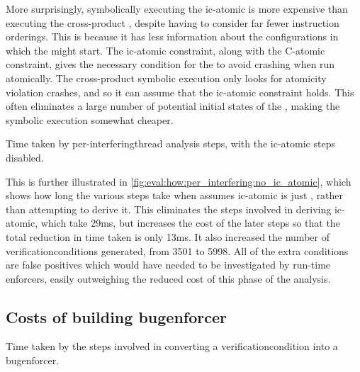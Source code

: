 More surprisingly, symbolically executing the \gls{ic-atomic}
{\StateMachine} is more expensive than executing the cross-product
{\StateMachine}, despite having to consider far fewer instruction
orderings.  This is because it has less information about the
configurations in which the {\StateMachines} might start.  The
\gls{ic-atomic} constraint, along with the C-atomic constraint, gives
the necessary condition for the {\StateMachines} to avoid crashing
when run atomically.  The cross-product symbolic execution only looks
for atomicity violation crashes, and so it can assume that the
\gls{ic-atomic} constraint holds.  This often eliminates a large
number of potential initial states of the {\StateMachines}, making the
symbolic execution somewhat cheaper.

\begin{sanefig}
  \caption{Time taken by per-\gls{interferingthread} analysis steps,
    with the \gls{ic-atomic} steps disabled.}
  \label{fig:eval:how:per_interfering:no_ic_atomic}
\end{sanefig}

This is further illustrated in
\autoref{fig:eval:how:per_interfering:no_ic_atomic}, which shows how
long the various steps take when {\technique} assumes \gls{ic-atomic}
is just \true, rather than attempting to derive it.  This eliminates
the steps involved in deriving \gls{ic-atomic}, which take 29ms, but
increases the cost of the later steps so that the total reduction in
time taken is only 13ms.  It also increased the number of
\glspl{verificationcondition} generated, from 3501 to 5998.  All of
the extra conditions are false positives which would have needed to be
investigated by run-time enforcers, easily outweighing the reduced
cost of this phase of the analysis.


\subsection{Costs of building \gls{bugenforcer}}

\begin{sanefig}
  \!\!\!
  \caption{Time taken by the steps involved in converting a
    \gls{verificationcondition} into a \gls{bugenforcer}.}
  \label{fig:eval:how:build_enforcer}
\end{sanefig}

